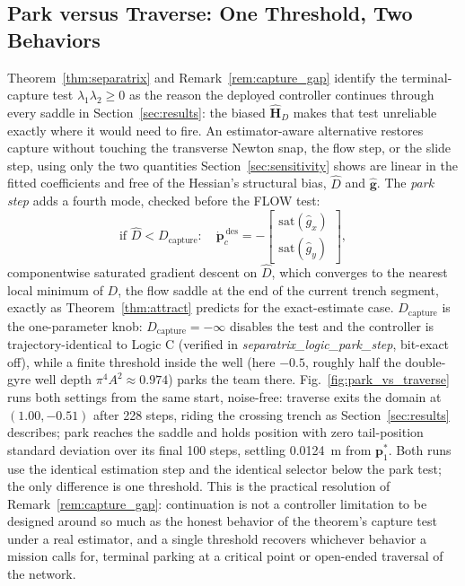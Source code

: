 \documentclass[lettersize,journal]{IEEEtran}
\begin{document}
\subsection{Park versus Traverse: One Threshold, Two Behaviors}
\label{sec:park_vs_traverse}

Theorem~\ref{thm:separatrix} and Remark~\ref{rem:capture_gap} identify
the terminal-capture test $\lambda_1\lambda_2 \geq 0$ as the reason the
deployed controller continues through every saddle in
Section~\ref{sec:results}: the biased $\hat{\mathbf{H}}_D$ makes that
test unreliable exactly where it would need to fire. An estimator-aware
alternative restores capture without touching the transverse Newton
snap, the flow step, or the slide step, using only the two quantities
Section~\ref{sec:sensitivity} shows are linear in the fitted
coefficients and free of the Hessian's structural bias, $\hat{D}$ and
$\hat{\mathbf{g}}$. The \emph{park step} adds a fourth mode, checked
before the FLOW test:
\begin{equation}
    \text{if } \hat{D} < D_{\text{capture}}:\quad
    \dot{\mathbf{p}}_c^{\,\text{des}} =
    -\begin{bmatrix}
        \mathrm{sat}(\hat{g}_x) \\ \mathrm{sat}(\hat{g}_y)
    \end{bmatrix},
    \label{eq:park_step}
\end{equation}
componentwise saturated gradient descent on $\hat{D}$, which converges
to the nearest local minimum of $D$, the flow saddle at the end of the
current trench segment, exactly as Theorem~\ref{thm:attract} predicts
for the exact-estimate case. $D_{\text{capture}}$ is the one-parameter
knob: $D_{\text{capture}} = -\infty$ disables the test and the
controller is trajectory-identical to Logic C (verified in
\textit{separatrix\_logic\_park\_step}, bit-exact off), while a finite
threshold inside the well (here $-0.5$, roughly half the double-gyre
well depth $\pi^4 A^2 \approx 0.974$) parks the team there.
Fig.~\ref{fig:park_vs_traverse} runs both settings from the same start,
noise-free: traverse exits the domain at $(1.00, -0.51)$ after 228
steps, riding the crossing trench as Section~\ref{sec:results}
describes; park reaches the saddle and holds position with zero
tail-position standard deviation over its final 100 steps, settling
0.0124~m from $\mathbf{p}^*_1$. Both runs use the identical estimation
step and the identical selector below the park test; the only
difference is one threshold. This is the practical resolution of
Remark~\ref{rem:capture_gap}: continuation is not a controller limitation
to be designed around so much as the honest behavior of the theorem's
capture test under a real estimator, and a single threshold recovers
whichever behavior a mission calls for, terminal parking at a critical
point or open-ended traversal of the network.
\end{document}
